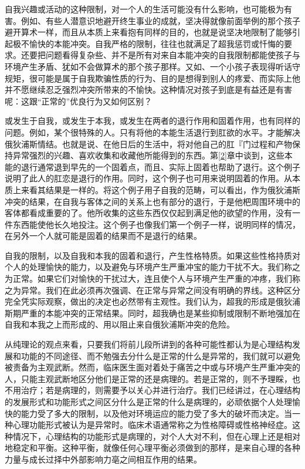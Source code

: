 \documentclass[UTF8,10pt,a4paper,openany]{book}
\begin{document}
自我兴趣或活动的这种限制，对一个人的生活可能没有什么影响，也可能极为有害。例如、有些人潜意识地避开终生事业的成就，坚决得就像前面举例的那个孩子避开算术一样，而且从本质上来看抱有同样的目的，也就是说坚决地限制了能够引起极不愉快的本能冲突。自我严格的限制，往往也就满足了超我惩罚或忏悔的要求。还要把问题看得复杂些、并不是所有对来自本能冲突的自我限制都能使孩子与环境产生矛盾、犹如不会做算术的那个孩子那样。又如、一个小孩子表现得听话守规矩，很可能是属于自我欺骗性质的行为、目的是想得到别人的疼爱、而实际上他并不愿继续忍乏强烈冲突所带来的不愉快。这种情况对孩子到底是有益还是有害呢：这跟“正常的”优良行为又如何区别？

或发生于自我，或发生于本我，或发生在两者的退行作用和固着作用，也有同样的问题。例如，某个很特殊的人。只有将他的本能生活退行到肛欲的水平。才能解决俄狄浦斯情结。也就是说、在他日后的生活中，将对他自己的肛『门过程和产物保持异常强烈的兴趣、喜欢收集和收藏他所能得到的东西。第\ref{2}章中谈到，这些本能的退行通常退到早先的一个固着点，而且、实际上固着也帮助了退行。这个例子说明了此人的肛恋是退行的作用。同时，这个例子也可用来说明固着的作用。从本质上来看其结果是一样的。将这个例子用子自我的范畴，可以看出，作为俄狄浦斯冲突的结果，在自我与客体之间的关系上也有部分的退行，于是他杷周围环境中的客体都看成重要的了。他所收集的这些东西仅仅起到满足他的欲望的作用，没有一件东西能使他长久地投注。这个例子也像我们第一个例子一样，说明同样的情况，在另外一个人就可能是固着的结果而不是退行的结果。

自我的限制，以及自我和本我的固着和退行，产生性格特质。如果这些性格持质对个人的处理愉快的能力，以及避免与环境产生严重冲宝的能力干扰不大。我们称之为正常。如果它们对愉快的干扰过大，连且使个人与环境产生严重的冲疼，我们称之为异常。我们在此必须再次强调、在正常与异常之间没有明确的界线。这种区分完全凭实际观察，做出的决定也必然带有主观性。我们认为，超我的形成是俄狄浦斯期严重的本能冲突的正常结果。同时，超我确也是某些抑制或限制不断地强加在自我和本我之上而形成的、用以阻止来自俄狄浦斯冲突的危险。

从纯理论的观点来看，只要我们将前儿段所讲到的各种可能性都认为是心理结构发展和功能的不同途径、而不勉强去分什么是正常的什么是异常的，我们就可以避免被责备为主观武断。然而，临床医生面对着处于痛苦之中或与环境产生严重冲突的人，只能主观武断地区分他们是正常的还是病理的。若是正常的，则不予理睬，也不用治疗；若是病理的，则需要予以关心并进行治疗。我们已经讲过，在心理结构的发展形式和功能形式之间区分什么是正常的什么是病理的，必顽依据个人处理愉快的能力受了多大的限制，以及他对环境运应的能力受了多大的破坏而决定。当一种心理功能形式被认为是异常时。临床术语通常称之为性格障碍或性格神经症。这种情况下，心理结构的功能形式是病理的，对个人大对不利，但在心理上还是相对地稳定和平衡。这种平衡，就像任何心理平衡必须做到的那样，是来自心理的各种力量与成长过择中外部影响力亳之间相互作用的结果。
\end{document}
